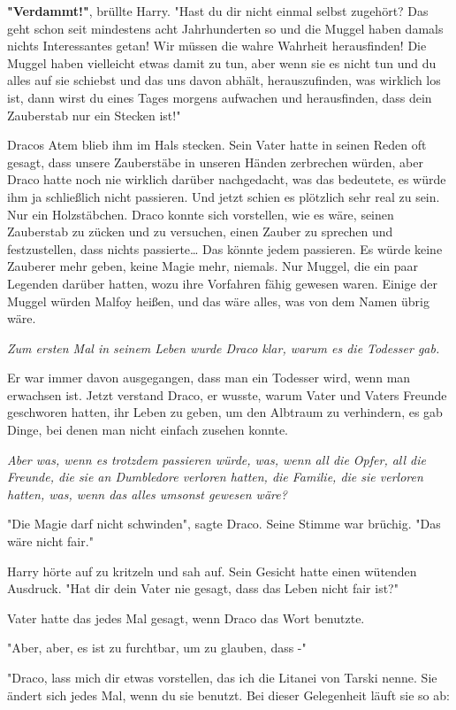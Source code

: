 {\textbf{"Verdammt!"}, brüllte Harry. "Hast du dir nicht einmal selbst zugehört? Das geht schon seit mindestens acht Jahrhunderten so und die Muggel haben damals nichts Interessantes getan! Wir müssen die wahre Wahrheit herausfinden! Die Muggel haben vielleicht etwas damit zu tun, aber wenn sie es nicht tun und du alles auf sie schiebst und das uns davon abhält, herauszufinden, was wirklich los ist, dann wirst du eines Tages morgens aufwachen und herausfinden, dass dein Zauberstab nur ein Stecken ist!"

Dracos Atem blieb ihm im Hals stecken. Sein Vater hatte in seinen Reden oft gesagt, dass unsere Zauberstäbe in unseren Händen zerbrechen würden, aber Draco hatte noch nie wirklich darüber nachgedacht, was das bedeutete, es würde ihm ja schließlich nicht passieren. Und jetzt schien es plötzlich sehr real zu sein. Nur ein Holzstäbchen. Draco konnte sich vorstellen, wie es wäre, seinen Zauberstab zu zücken und zu versuchen, einen Zauber zu sprechen und festzustellen, dass nichts passierte… Das könnte jedem passieren. Es würde keine Zauberer mehr geben, keine Magie mehr, niemals. Nur Muggel, die ein paar Legenden darüber hatten, wozu ihre Vorfahren fähig gewesen waren. Einige der Muggel würden Malfoy heißen, und das wäre alles, was von dem Namen übrig wäre.

\emph{Zum ersten Mal in seinem Leben wurde Draco klar, warum es die Todesser gab.}

Er war immer davon ausgegangen, dass man ein Todesser wird, wenn man erwachsen ist. Jetzt verstand Draco, er wusste, warum Vater und Vaters Freunde geschworen hatten, ihr Leben zu geben, um den Albtraum zu verhindern, es gab Dinge, bei denen man nicht einfach zusehen konnte.

\emph{Aber was, wenn es trotzdem passieren würde, was, wenn all die Opfer, all die Freunde, die sie an Dumbledore verloren hatten, die Familie, die sie verloren hatten, was, wenn das alles umsonst gewesen wäre?}

"Die Magie darf nicht schwinden", sagte Draco. Seine Stimme war brüchig. "Das wäre nicht fair."

Harry hörte auf zu kritzeln und sah auf. Sein Gesicht hatte einen wütenden Ausdruck. "Hat dir dein Vater nie gesagt, dass das Leben nicht fair ist?"

Vater hatte das jedes Mal gesagt, wenn Draco das Wort benutzte.

"Aber, aber, es ist zu furchtbar, um zu glauben, dass -"

"Draco, lass mich dir etwas vorstellen, das ich die Litanei von Tarski nenne. Sie ändert sich jedes Mal, wenn du sie benutzt. Bei dieser Gelegenheit läuft sie so ab:

}
